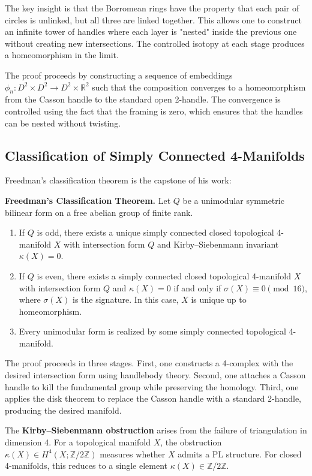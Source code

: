 The key insight is that the Borromean rings have the property that each pair of circles is unlinked, but all three are linked together. This allows one to construct an infinite tower of handles where each layer is "nested" inside the previous one without creating new intersections. The controlled isotopy at each stage produces a homeomorphism in the limit.

The proof proceeds by constructing a sequence of embeddings $\phi_n: D^2 \times D^2 \to D^2 \times \mathbb{R}^2$ such that the composition converges to a homeomorphism from the Casson handle to the standard open 2-handle. The convergence is controlled using the fact that the framing is zero, which ensures that the handles can be nested without twisting.

\subsection*{Classification of Simply Connected 4-Manifolds}

Freedman's classification theorem is the capstone of his work:

\textbf{Freedman's Classification Theorem.} Let $Q$ be a unimodular symmetric bilinear form on a free abelian group of finite rank.
\begin{enumerate}
    \item If $Q$ is odd, there exists a unique simply connected closed topological 4-manifold $X$ with intersection form $Q$ and Kirby--Siebenmann invariant $\kappa(X) = 0$.
    \item If $Q$ is even, there exists a simply connected closed topological 4-manifold $X$ with intersection form $Q$ and $\kappa(X) = 0$ if and only if $\sigma(X) \equiv 0 \pmod{16}$, where $\sigma(X)$ is the signature. In this case, $X$ is unique up to homeomorphism.
    \item Every unimodular form is realized by some simply connected topological 4-manifold.
\end{enumerate}

The proof proceeds in three stages. First, one constructs a 4-complex with the desired intersection form using handlebody theory. Second, one attaches a Casson handle to kill the fundamental group while preserving the homology. Third, one applies the disk theorem to replace the Casson handle with a standard 2-handle, producing the desired manifold.

The \textbf{Kirby--Siebenmann obstruction} arises from the failure of triangulation in dimension 4. For a topological manifold $X$, the obstruction $\kappa(X) \in H^4(X; \mathbb{Z}/2\mathbb{Z})$ measures whether $X$ admits a PL structure. For closed 4-manifolds, this reduces to a single element $\kappa(X) \in \mathbb{Z}/2\mathbb{Z}$.

